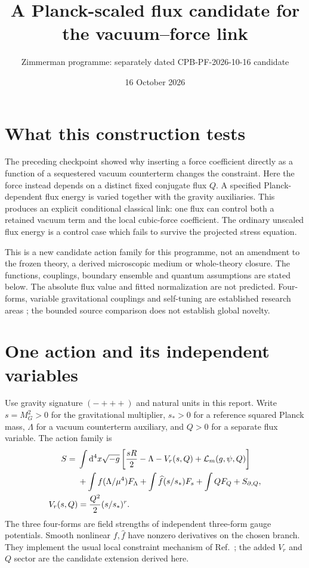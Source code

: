 \documentclass[11pt]{article}
\title{A Planck-scaled flux candidate for the vacuum--force link}
\author{Zimmerman programme: separately dated CPB-PF-2026-10-16 candidate}
\date{16 October 2026}
\newcommand{\dd}{\mathrm d}
\begin{document}
\maketitle
\section{What this construction tests}
The preceding checkpoint showed why inserting a force coefficient directly
as a function of a sequestered vacuum counterterm changes the constraint.
Here the force instead depends on a distinct fixed conjugate flux $Q$.
A specified Planck-dependent flux energy is varied together with the
gravity auxiliaries. This produces an explicit conditional classical link:
one flux can control both a retained vacuum term and the local cubic-force
coefficient. The ordinary unscaled flux energy is a control case which
fails to survive the projected stress equation.

This is a new candidate action family for this programme, not an amendment
to the frozen theory, a derived microscopic medium or whole-theory closure.
The functions, couplings, boundary ensemble and quantum assumptions are
stated below. The absolute flux value and fitted normalization are not
predicted. Four-forms, variable gravitational couplings and self-tuning
are established research areas \cite{pf:sequester,pf:qtheory,pf:planck};
the bounded source comparison does not establish global novelty.

\section{One action and its independent variables}
Use gravity signature $(-+++)$ and natural units in this report. Write
$s=M_G^2>0$ for the gravitational multiplier, $s_*>0$ for a reference
squared Planck mass, $\Lambda$ for a vacuum counterterm auxiliary, and
$Q>0$ for a separate flux variable. The action family is
\begin{align}
 S={}&\int\dd^4x\sqrt{-g}\left[{sR\over2}-\Lambda
               -V_r(s,Q)+\mathcal L_m(g,\psi,Q)\right]\nonumber\\
 &+\int f(\Lambda/\mu^4)F_\Lambda
       +\int\widehat f(s/s_*)F_s+\int QF_Q+S_{\partial,Q},\\
 V_r(s,Q)&={Q^2\over2}(s/s_*)^r.
 \label{pf:action}
\end{align}
The three four-forms are field strengths of independent three-form gauge
potentials. Smooth nonlinear $f,\widehat f$ have nonzero derivatives on
the chosen branch. They implement the usual local constraint mechanism
of Ref.~\cite{pf:sequester}; the added $V_r$ and $Q$ sector are the
candidate extension derived here.
\end{document}
